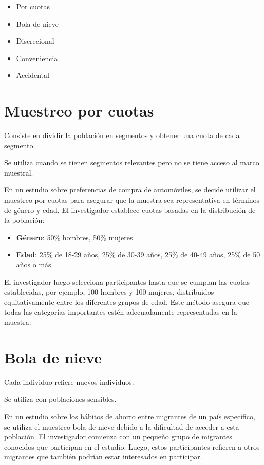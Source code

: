 \documentclass[
  letterpaper,
  DIV=11,
  numbers=noendperiod]{scrreprt}
\providecommand{\tightlist}{%
  \setlength{\itemsep}{0pt}\setlength{\parskip}{0pt}}\usepackage{longtable,booktabs,array}
\begin{document}
\begin{itemize}
\tightlist
\item
  Por cuotas
\item
  Bola de nieve
\item
  Discrecional
\item
  Conveniencia
\item
  Accidental
\end{itemize}

\section{Muestreo por cuotas}\label{muestreo-por-cuotas}

Consiste en dividir la población en segmentos y obtener una cuota de
cada segmento.

Se utiliza cuando se tienen segmentos relevantes pero no se tiene acceso
al marco muestral.

En un estudio sobre preferencias de compra de automóviles, se decide
utilizar el muestreo por cuotas para asegurar que la muestra sea
representativa en términos de género y edad. El investigador establece
cuotas basadas en la distribución de la población:

\begin{itemize}
\tightlist
\item
  \textbf{Género}: 50\% hombres, 50\% mujeres.
\item
  \textbf{Edad}: 25\% de 18-29 años, 25\% de 30-39 años, 25\% de 40-49
  años, 25\% de 50 años o más.
\end{itemize}

El investigador luego selecciona participantes hasta que se cumplan las
cuotas establecidas, por ejemplo, 100 hombres y 100 mujeres,
distribuidos equitativamente entre los diferentes grupos de edad. Este
método asegura que todas las categorías importantes estén adecuadamente
representadas en la muestra.

\section{Bola de nieve}\label{bola-de-nieve}

Cada individuo refiere nuevos individuos.

Se utiliza con poblaciones sensibles.

En un estudio sobre los hábitos de ahorro entre migrantes de un país
específico, se utiliza el muestreo bola de nieve debido a la dificultad
de acceder a esta población. El investigador comienza con un pequeño
grupo de migrantes conocidos que participan en el estudio. Luego, estos
participantes refieren a otros migrantes que también podrían estar
interesados en participar.
\end{document}
